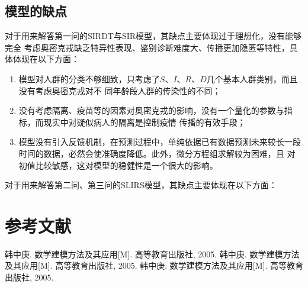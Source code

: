 \documentclass[bwprint]{gmcmthesis}
\numberwithin{figure}{section}
\begin{document}
\subsection{模型的缺点}
\par 对于用来解答第一问的SIRDT与SIR模型，其缺点主要体现过于理想化，没有能够完全
考虑奥密克戎缺乏特异性表现、鉴别诊断难度大、传播更加隐匿等特性，具体体现在以下方面：
\begin{enumerate}
  \item 模型对人群的分类不够细致，只考虑了$S$、$I$、$R$、$D$几个基本人群类别，而且没有考虑奥密克戎对不
  同年龄段人群的传染性的不同；
  \item 没有考虑隔离、疫苗等的因素对奥密克戎的影响，没有一个量化的参数与指标，而现实中对疑似病人的隔离是控制疫情
  传播的有效手段；
  \item 模型没有引入反馈机制，在预测过程中，单纯依据已有数据预测未来较长一段时间的数据，必然会使准确度降低。此外，微分方程组求解较为困难，且
  对初值比较敏感，这对模型的稳健性是一个很大的影响。
  \end{enumerate}
\par 对于用来解答第二问、第三问的SLIRS模型，其缺点主要体现在以下方面：

\section{参考文献}
\begin{thebibliography}{1.2}%
\setlength{\itemsep}{-2mm}
 韩中庚. 数学建模方法及其应用[M]. 高等教育出版社, 2005.
 韩中庚. 数学建模方法及其应用[M]. 高等教育出版社, 2005.
 韩中庚. 数学建模方法及其应用[M]. 高等教育出版社, 2005.
\end{thebibliography}




\newpage
\appendix
\end{document}
